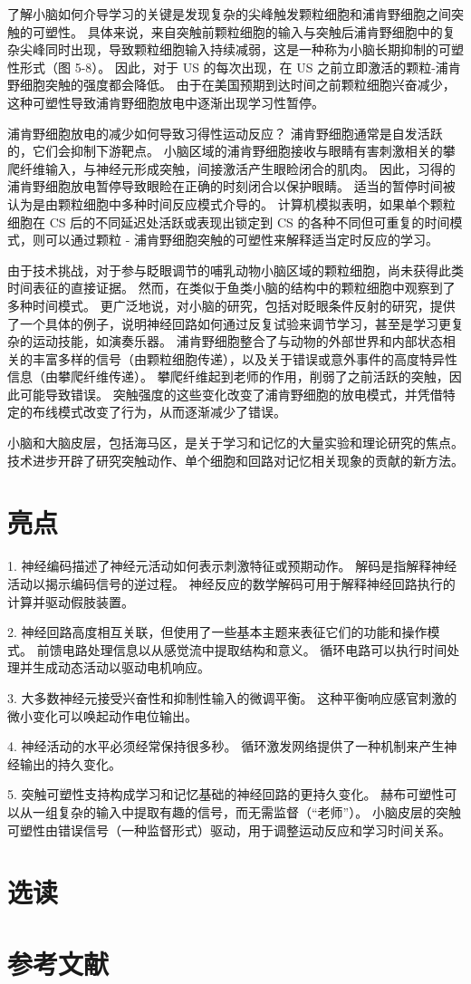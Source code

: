 了解小脑如何介导学习的关键是发现复杂的尖峰触发颗粒细胞和浦肯野细胞之间突触的可塑性。 具体来说，来自突触前颗粒细胞的输入与突触后浦肯野细胞中的复杂尖峰同时出现，导致颗粒细胞输入持续减弱，这是一种称为小脑长期抑制的可塑性形式（图 5-8）。 因此，对于 US 的每次出现，在 US 之前立即激活的颗粒-浦肯野细胞突触的强度都会降低。 由于在美国预期到达时间之前颗粒细胞兴奋减少，这种可塑性导致浦肯野细胞放电中逐渐出现学习性暂停。

浦肯野细胞放电的减少如何导致习得性运动反应？ 浦肯野细胞通常是自发活跃的，它们会抑制下游靶点。 小脑区域的浦肯野细胞接收与眼睛有害刺激相关的攀爬纤维输入，与神经元形成突触，间接激活产生眼睑闭合的肌肉。 因此，习得的浦肯野细胞放电暂停导致眼睑在正确的时刻闭合以保护眼睛。 适当的暂停时间被认为是由颗粒细胞中多种时间反应模式介导的。 计算机模拟表明，如果单个颗粒细胞在 CS 后的不同延迟处活跃或表现出锁定到 CS 的各种不同但可重复的时间模式，则可以通过颗粒 - 浦肯野细胞突触的可塑性来解释适当定时反应的学习。

由于技术挑战，对于参与眨眼调节的哺乳动物小脑区域的颗粒细胞，尚未获得此类时间表征的直接证据。 然而，在类似于鱼类小脑的结构中的颗粒细胞中观察到了多种时间模式。 更广泛地说，对小脑的研究，包括对眨眼条件反射的研究，提供了一个具体的例子，说明神经回路如何通过反复试验来调节学习，甚至是学习更复杂的运动技能，如演奏乐器。 浦肯野细胞整合了与动物的外部世界和内部状态相关的丰富多样的信号（由颗粒细胞传递），以及关于错误或意外事件的高度特异性信息（由攀爬纤维传递）。 攀爬纤维起到老师的作用，削弱了之前活跃的突触，因此可能导致错误。 突触强度的这些变化改变了浦肯野细胞的放电模式，并凭借特定的布线模式改变了行为，从而逐渐减少了错误。

小脑和大脑皮层，包括海马区，是关于学习和记忆的大量实验和理论研究的焦点。 技术进步开辟了研究突触动作、单个细胞和回路对记忆相关现象的贡献的新方法。


\section{亮点}
1. 神经编码描述了神经元活动如何表示刺激特征或预期动作。 解码是指解释神经活动以揭示编码信号的逆过程。 神经反应的数学解码可用于解释神经回路执行的计算并驱动假肢装置。 

2. 神经回路高度相互关联，但使用了一些基本主题来表征它们的功能和操作模式。 前馈电路处理信息以从感觉流中提取结构和意义。 循环电路可以执行时间处理并生成动态活动以驱动电机响应。 

3. 大多数神经元接受兴奋性和抑制性输入的微调平衡。 这种平衡响应感官刺激的微小变化可以唤起动作电位输出。 

4. 神经活动的水平必须经常保持很多秒。 循环激发网络提供了一种机制来产生神经输出的持久变化。 

5. 突触可塑性支持构成学习和记忆基础的神经回路的更持久变化。 赫布可塑性可以从一组复杂的输入中提取有趣的信号，而无需监督（“老师”）。 小脑皮层的突触可塑性由错误信号（一种监督形式）驱动，用于调整运动反应和学习时间关系。

\section{选读}
\section{参考文献}

